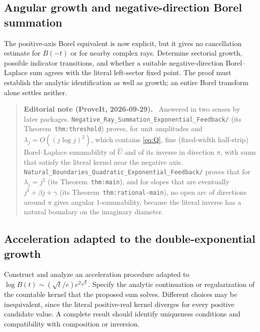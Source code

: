\documentclass[11pt,a4paper]{article}
\theoremstyle{definition}
\newcommand{\U}{\widehat U}
\numberwithin{equation}{section}
\newenvironment{ednote}{\par\smallskip\begin{quote}\small\raggedright\textbf{Editorial note (ProveIt, 2026-09-29).}\ }{\end{quote}\smallskip}
\begin{document}
\subsection{Angular growth and negative-direction Borel summation}
The positive-axis Borel equivalent is now explicit, but it gives no
cancellation estimate for \(B(-t)\) or for nearby complex rays. Determine
sectorial growth, possible indicator transitions, and whether a suitable
negative-direction Borel--Laplace sum agrees with the literal left-sector
fixed point. The proof must establish the analytic identification as well
as growth; an entire Borel transform alone settles neither.
\begin{ednote}
Answered in two senses by later packages.
\nolinkurl{Negative_Ray_Summation_Exponential_Feedback/} (its
Theorem~\texttt{thm:threshold}) proves, for unit amplitudes and
$\lambda_j=O((j\log j)^2)$, which contains \eqref{eq:Q}, fine
(fixed-width half-strip) Borel--Laplace summability of $\U$ and of its
inverse in direction $\pi$, with sums that satisfy the literal kernel near
the negative axis.
\nolinkurl{Natural_Boundaries_Quadratic_Exponential_Feedback/} proves that
for $\lambda_j=j^2$ (its Theorem~\texttt{thm:main}), and for slopes that are
eventually $j^2+\beta j+\gamma$ (its Theorem~\texttt{thm:rational-main}), no open
arc of directions around $\pi$ gives angular $1$-summability, because the
literal inverse has a natural boundary on the imaginary diameter.
\end{ednote}

\subsection{Acceleration adapted to the double-exponential growth}
Construct and analyze an acceleration procedure adapted to
\(\log B(t)\sim(\sqrt t/e)e^{2\sqrt t}\). Specify the analytic
continuation or regularization of the countable kernel that the proposed
sum solves. Different choices may be inequivalent, since the literal
positive-real kernel diverges for every positive candidate value. A
complete result should identify uniqueness conditions and compatibility
with composition or inversion.
\end{document}
